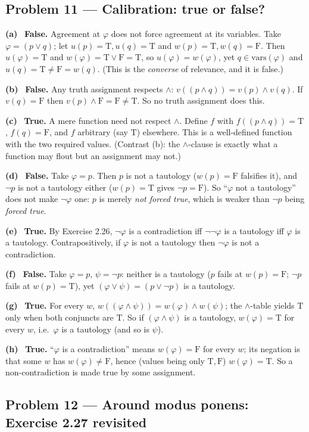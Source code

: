 \documentclass[11pt]{article}
\newcommand{\T}{\mathrm{T}}
\newcommand{\F}{\mathrm{F}}
\newcommand{\vars}{\mathrm{vars}}
\newcommand{\solpart}[1]{\smallskip\noindent\textbf{(#1)}\ }
\newcommand{\prob}[2]{\subsection*{Problem #1 --- #2}}
\begin{document}
\prob{11}{Calibration: true or false?}

\solpart{a} \textbf{False.} Agreement at $\varphi$ does not force agreement at its
variables. Take $\varphi=(p\lor q)$; let $u(p)=\T,u(q)=\T$ and $w(p)=\T,w(q)=\F$.
Then $u(\varphi)=\T$ and $w(\varphi)=\T\lor\F=\T$, so $u(\varphi)=w(\varphi)$, yet
$q\in\vars(\varphi)$ and $u(q)=\T\neq\F=w(q)$. (This is the \emph{converse} of
relevance, and it is false.)

\solpart{b} \textbf{False.} Any truth assignment respects $\land$:
$v((p\land q))=v(p)\land v(q)$. If $v(q)=\F$ then $v(p)\land\F=\F\neq\T$. So no
truth assignment does this.

\solpart{c} \textbf{True.} A mere function need not respect $\land$. Define $f$ with
$f((p\land q))=\T$, $f(q)=\F$, and $f$ arbitrary (say $\T$) elsewhere. This is a
well-defined function with the two required values. (Contrast (b): the $\land$-clause
is exactly what a function may flout but an assignment may not.)

\solpart{d} \textbf{False.} Take $\varphi=p$. Then $p$ is not a tautology ($w(p)=\F$
falsifies it), and $\lnot p$ is not a tautology either ($w(p)=\T$ gives $\lnot p=\F$).
So ``$\varphi$ not a tautology'' does not make $\lnot\varphi$ one: $p$ is merely
\emph{not forced true}, which is weaker than $\lnot p$ being \emph{forced true}.

\solpart{e} \textbf{True.} By Exercise 2.26, $\lnot\varphi$ is a contradiction iff
$\lnot\lnot\varphi$ is a tautology iff $\varphi$ is a tautology. Contrapositively,
if $\varphi$ is not a tautology then $\lnot\varphi$ is not a contradiction.

\solpart{f} \textbf{False.} Take $\varphi=p$, $\psi=\lnot p$: neither is a tautology
($p$ fails at $w(p)=\F$; $\lnot p$ fails at $w(p)=\T$), yet $(\varphi\lor\psi)=
(p\lor\lnot p)$ is a tautology.

\solpart{g} \textbf{True.} For every $w$, $w((\varphi\land\psi))=w(\varphi)\land
w(\psi)$; the $\land$-table yields $\T$ only when both conjuncts are $\T$. So if
$(\varphi\land\psi)$ is a tautology, $w(\varphi)=\T$ for every $w$, i.e.\ $\varphi$
is a tautology (and so is $\psi$).

\solpart{h} \textbf{True.} ``$\varphi$ is a contradiction'' means $w(\varphi)=\F$
for every $w$; its negation is that some $w$ has $w(\varphi)\neq\F$, hence (values
being only $\T,\F$) $w(\varphi)=\T$. So a non-contradiction is made true by some
assignment.

\prob{12}{Around modus ponens: Exercise 2.27 revisited}
\end{document}
